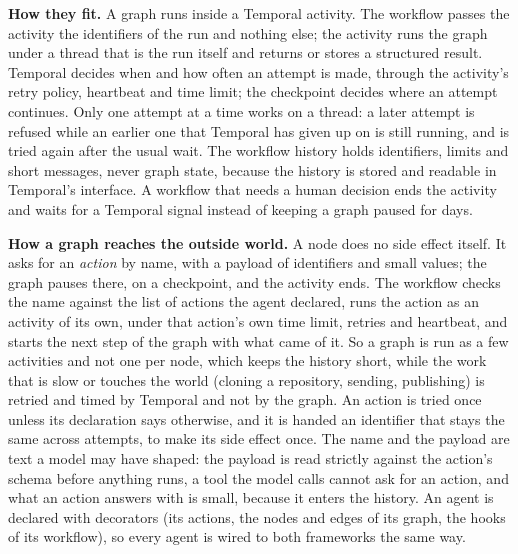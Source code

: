 \documentclass[11pt,a4paper]{article}
\begin{document}
\textbf{How they fit.} A graph runs inside a Temporal activity. The workflow passes the activity the identifiers of the run and nothing else; the activity runs the graph under a thread that is the run itself and returns or stores a structured result. Temporal decides when and how often an attempt is made, through the activity's retry policy, heartbeat and time limit; the checkpoint decides where an attempt continues. Only one attempt at a time works on a thread: a later attempt is refused while an earlier one that Temporal has given up on is still running, and is tried again after the usual wait. The workflow history holds identifiers, limits and short messages, never graph state, because the history is stored and readable in Temporal's interface. A workflow that needs a human decision ends the activity and waits for a Temporal signal instead of keeping a graph paused for days.

\textbf{How a graph reaches the outside world.} A node does no side effect itself. It asks for an \emph{action} by name, with a payload of identifiers and small values; the graph pauses there, on a checkpoint, and the activity ends. The workflow checks the name against the list of actions the agent declared, runs the action as an activity of its own, under that action's own time limit, retries and heartbeat, and starts the next step of the graph with what came of it. So a graph is run as a few activities and not one per node, which keeps the history short, while the work that is slow or touches the world (cloning a repository, sending, publishing) is retried and timed by Temporal and not by the graph. An action is tried once unless its declaration says otherwise, and it is handed an identifier that stays the same across attempts, to make its side effect once. The name and the payload are text a model may have shaped: the payload is read strictly against the action's schema before anything runs, a tool the model calls cannot ask for an action, and what an action answers with is small, because it enters the history. An agent is declared with decorators (its actions, the nodes and edges of its graph, the hooks of its workflow), so every agent is wired to both frameworks the same way.
\end{document}
